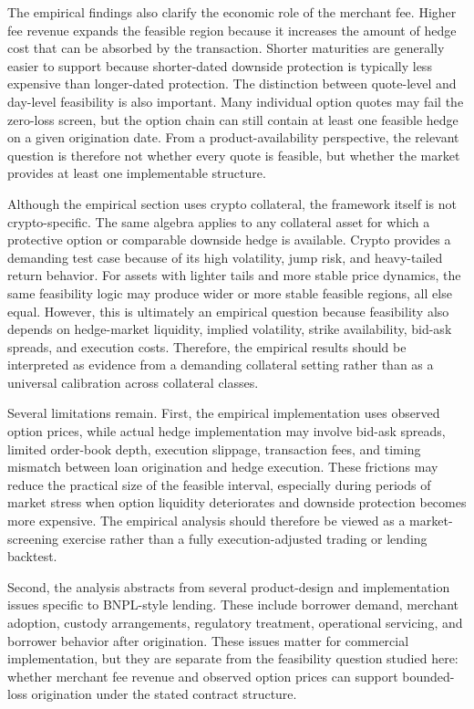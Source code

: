 \documentclass[11pt]{article}
\begin{document}
The empirical findings also clarify the economic role of the merchant fee. Higher fee revenue expands the feasible region because it increases the amount of hedge cost that can be absorbed by the transaction. Shorter maturities are generally easier to support because shorter-dated downside protection is typically less expensive than longer-dated protection. The distinction between quote-level and day-level feasibility is also important. Many individual option quotes may fail the zero-loss screen, but the option chain can still contain at least one feasible hedge on a given origination date. From a product-availability perspective, the relevant question is therefore not whether every quote is feasible, but whether the market provides at least one implementable structure.

Although the empirical section uses crypto collateral, the framework itself is not crypto-specific. The same algebra applies to any collateral asset for which a protective option or comparable downside hedge is available. Crypto provides a demanding test case because of its high volatility, jump risk, and heavy-tailed return behavior. For assets with lighter tails and more stable price dynamics, the same feasibility logic may produce wider or more stable feasible regions, all else equal. However, this is ultimately an empirical question because feasibility also depends on hedge-market liquidity, implied volatility, strike availability, bid-ask spreads, and execution costs. Therefore, the empirical results should be interpreted as evidence from a demanding collateral setting rather than as a universal calibration across collateral classes.

Several limitations remain. First, the empirical implementation uses observed option prices, while actual hedge implementation may involve bid-ask spreads, limited order-book depth, execution slippage, transaction fees, and timing mismatch between loan origination and hedge execution. These frictions may reduce the practical size of the feasible interval, especially during periods of market stress when option liquidity deteriorates and downside protection becomes more expensive. The empirical analysis should therefore be viewed as a market-screening exercise rather than a fully execution-adjusted trading or lending backtest.

Second, the analysis abstracts from several product-design and implementation issues specific to BNPL-style lending. These include borrower demand, merchant adoption, custody arrangements, regulatory treatment, operational servicing, and borrower behavior after origination. These issues matter for commercial implementation, but they are separate from the feasibility question studied here: whether merchant fee revenue and observed option prices can support bounded-loss origination under the stated contract structure.
\end{document}
